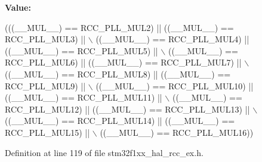 {\bfseries Value\+:}
\begin{DoxyCode}
(((\_\_MUL\_\_) == RCC\_PLL\_MUL2)  || ((\_\_MUL\_\_) == RCC\_PLL\_MUL3)  || \(\backslash\)
                                 ((\_\_MUL\_\_) == RCC\_PLL\_MUL4)  || ((\_\_MUL\_\_) == RCC\_PLL\_MUL5)  || \(\backslash\)
                                 ((\_\_MUL\_\_) == RCC\_PLL\_MUL6)  || ((\_\_MUL\_\_) == RCC\_PLL\_MUL7)  || \(\backslash\)
                                 ((\_\_MUL\_\_) == RCC\_PLL\_MUL8)  || ((\_\_MUL\_\_) == RCC\_PLL\_MUL9)  || \(\backslash\)
                                 ((\_\_MUL\_\_) == RCC\_PLL\_MUL10) || ((\_\_MUL\_\_) == RCC\_PLL\_MUL11) || \(\backslash\)
                                 ((\_\_MUL\_\_) == RCC\_PLL\_MUL12) || ((\_\_MUL\_\_) == RCC\_PLL\_MUL13) || \(\backslash\)
                                 ((\_\_MUL\_\_) == RCC\_PLL\_MUL14) || ((\_\_MUL\_\_) == RCC\_PLL\_MUL15) || \(\backslash\)
                                 ((\_\_MUL\_\_) == RCC\_PLL\_MUL16))
\end{DoxyCode}


Definition at line 119 of file stm32f1xx\+\_\+hal\+\_\+rcc\+\_\+ex.\+h.

